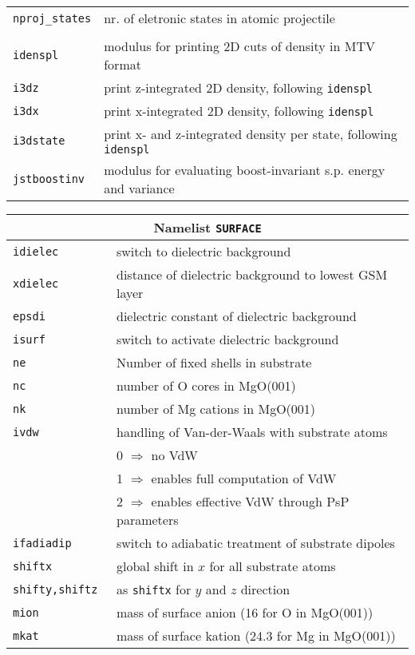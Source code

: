 \documentclass[12pt]{article}
\begin{document}
\begin{tabular}{ll}
{\tt nproj\_states} & nr. of eletronic states in atomic projectile \\
\\
{\tt idenspl} & modulus for printing 2D cuts of density in MTV format\\
{\tt i3dz} &  print z-integrated 2D density, following {\tt idenspl}\\
{\tt i3dx} &  print x-integrated 2D density, following {\tt idenspl}\\
{\tt i3dstate} & print  x- and z-integrated density per state, following {\tt idenspl}\\
{\tt jstboostinv} & modulus for evaluating boost-invariant s.p. energy
and variance\\
\hline
\end{tabular}


\begin{tabular}{ll}
\hline
\multicolumn{2}{c}{Namelist {\tt SURFACE}} in {\tt for005.<name>} \\
\hline
{\tt idielec } & switch to dielectric background  \\
{\tt xdielec } & distance of dielectric background to lowest GSM layer \\
{\tt epsdi } & dielectric constant of  dielectric background \\
{\tt isurf } & switch to activate  dielectric background  \\
\hline
{\tt ne               }& Number of fixed shells in substrate\\
{\tt nc               }& number of O cores in MgO(001)\\
{\tt nk               }& number of Mg cations in MgO(001)\\
{\tt ivdw} & handling of Van-der-Waals with substrate atoms\\
    & 0 $\Longrightarrow$ no VdW\\
    & 1 $\Longrightarrow$ enables full computation of VdW\\
    & 2 $\Longrightarrow$ enables effective VdW through PsP parameters\\
{\tt ifadiadip        }& switch to adiabatic treatment of substrate dipoles\\
{\tt shiftx           }& global shift in $x$ for all substrate atoms\\
{\tt shifty,shiftz    }& as {\tt shiftx} for $y$ and $z$ direction\\
{\tt mion             }& mass of surface anion (16 for O in MgO(001))\\
{\tt mkat             }& mass of surface kation (24.3 for Mg in MgO(001))\\

\end{tabular}
\end{document}
